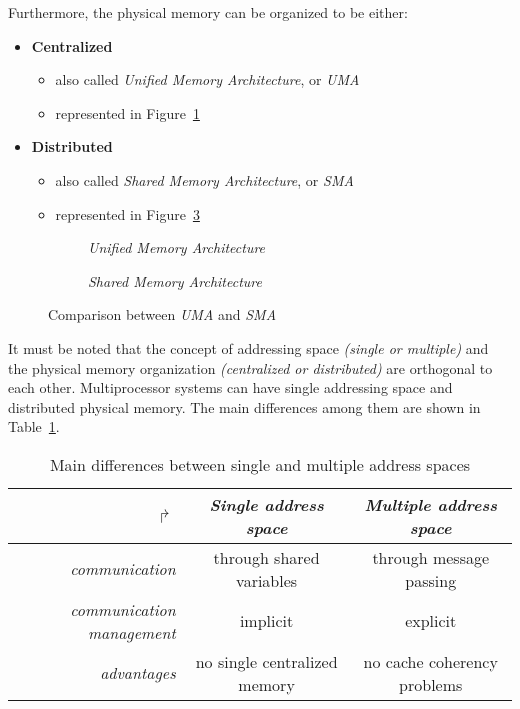 \documentclass[english]{article}
\begin{document}
Furthermore, the physical memory can be organized to be either:
\begin{itemize}
  \item \textbf{Centralized}
        \begin{itemize}
          \item also called \textit{Unified Memory Architecture}, or \textit{UMA}
          \item represented in Figure~\ref{subfig:uma}
        \end{itemize}
  \item \textbf{Distributed}
        \begin{itemize}
          \item also called \textit{Shared Memory Architecture}, or \textit{SMA}
          \item represented in Figure~\ref{subfig:sma}
        \end{itemize}
\end{itemize}

\begin{figure}[htbp]
  \bigskip
  \centering
  \begin{subfigure}[b]{0.495\textwidth}
    \centering
    \caption{\textit{Unified Memory Architecture}}
    \label{subfig:uma}
  \end{subfigure}
  \begin{subfigure}[b]{0.495\textwidth}
    \centering
    \caption{\textit{Shared Memory Architecture}}
    \label{subfig:sma}
  \end{subfigure}
  \caption{Comparison between \textit{UMA} and \textit{SMA}}
  \bigskip
\end{figure}

\bigskip
It must be noted that the concept of addressing space \textit{(single or multiple)} and the physical memory organization \textit{(centralized or distributed)} are orthogonal to each other.
Multiprocessor systems can have single addressing space and distributed physical memory.
The main differences among them are shown in Table~\ref{tab:address-spaces-differences}.

\begin{table}[htbp]
  \begin{tabular}{r|c|c}
    \(\Rsh\)                          & \textit{Single address space} & \textit{Multiple address space} \\ \hline
    \textit{communication}            & through shared variables      & through message passing         \\
    \textit{communication management} & implicit                      & explicit                        \\
    \textit{advantages}               & no single centralized memory  & no cache coherency problems
  \end{tabular}

  \caption{Main differences between single and multiple address spaces}
  \label{tab:address-spaces-differences}
\end{table}
\end{document}
